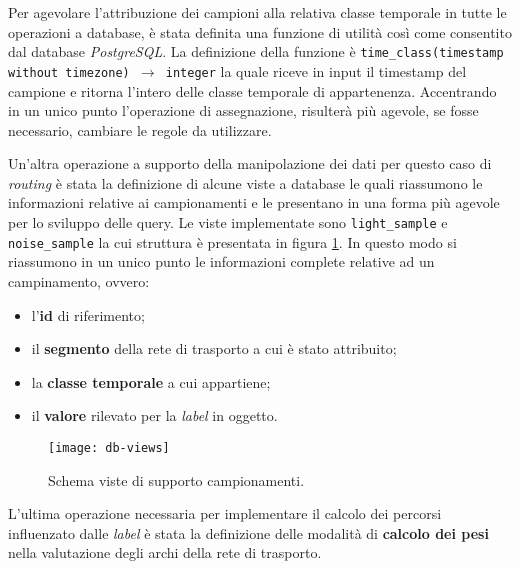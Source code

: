 Per agevolare l'attribuzione dei campioni alla relativa classe temporale in tutte le operazioni a database, è stata definita una funzione di utilità così come consentito dal database \emph{PostgreSQL}. La definizione della funzione è \texttt{time\_class(timestamp without timezone) $\rightarrow$ integer} la quale riceve in input il timestamp del campione e ritorna l'intero delle classe temporale di appartenenza. Accentrando in un unico punto l'operazione di assegnazione, risulterà più agevole, se fosse necessario, cambiare le regole da utilizzare. 

Un'altra operazione a supporto della manipolazione dei dati per questo caso di \emph{routing} è stata la definizione di alcune viste a database le quali riassumono le informazioni relative ai campionamenti e le presentano in una forma più agevole per lo sviluppo delle query. Le viste implementate sono \texttt{light\_sample} e \texttt{noise\_sample} la cui struttura è presentata in figura \ref{fig:db-views}. In questo modo si riassumono in un unico punto le informazioni complete relative ad un campinamento, ovvero:
\begin{itemize}
\item l'\textbf{id} di riferimento;
\item il \textbf{segmento} della rete di trasporto a cui è stato attribuito;
\item la \textbf{classe temporale} a cui appartiene;
\item il \textbf{valore} rilevato per la \emph{label} in oggetto.
\end{itemize}

\begin{figure}[ht]
  \centering
  \texttt{[image: db-views]}
  \caption{\footnotesize{Schema viste di supporto campionamenti.}}
  \label{fig:db-views}
\end{figure}

L'ultima operazione necessaria per implementare il calcolo dei percorsi influenzato dalle \emph{label} è stata la definizione delle modalità di \textbf{calcolo dei pesi} nella valutazione degli archi della rete di trasporto.

